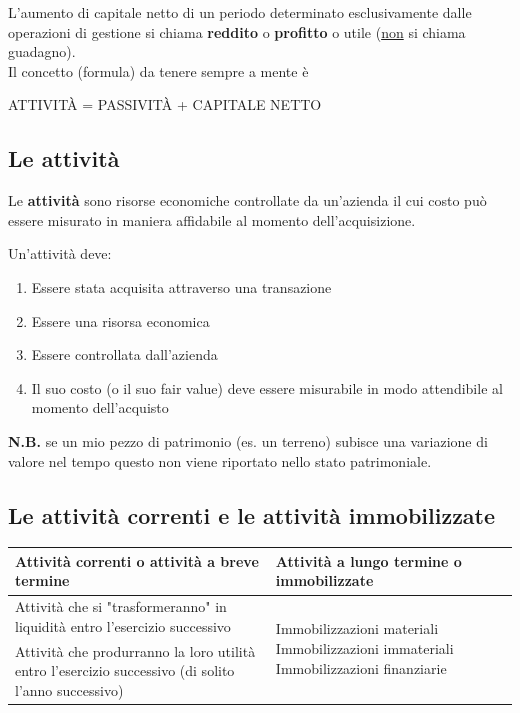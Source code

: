 \documentclass{article}
\begin{document}
L'aumento di capitale netto di un periodo determinato esclusivamente dalle
operazioni di gestione si chiama \textbf{reddito} o \textbf{profitto} o utile (\underline{non} si chiama
guadagno).
\vspace*{0.2cm}\\
Il concetto (formula) da tenere sempre a mente è 
\begin{center}
    ATTIVITÀ = PASSIVITÀ + CAPITALE NETTO
\end{center}



\subsection{Le attività}
\begin{center}
    Le \textbf{attività} sono risorse economiche controllate da un'azienda il cui costo può essere misurato in maniera affidabile al momento dell'acquisizione.
\end{center}
Un'attività deve:
\begin{enumerate}
    \item Essere stata acquisita attraverso una transazione
    \item Essere una risorsa economica
    \item Essere controllata dall'azienda
    \item Il suo costo (o il suo fair value) deve essere misurabile in modo attendibile al momento dell'acquisto
\end{enumerate}
\textbf{N.B.} se un mio pezzo di patrimonio (es. un terreno) subisce una variazione di valore nel tempo questo non viene riportato nello stato patrimoniale.


\subsection{Le attività correnti e le attività
immobilizzate}
\begin{center}
    \renewcommand{\arraystretch}{2}
    \begin{tabular}{|m{5cm}|m{5cm}|}
        \hline 
        \textbf{Attività correnti o attività a breve termine} & \textbf{Attività a lungo termine o immobilizzate}\\
        \hline 
        Attività che si "trasformeranno" in liquidità entro l'esercizio successivo & \multirow{2}{14em}{Immobilizzazioni materiali Immobilizzazioni immateriali  Immobilizzazioni finanziarie}
        \\
        Attività che produrranno la loro utilità entro l'esercizio successivo (di solito l'anno successivo) & \\
        \hline 
    \end{tabular}
\end{center}
\end{document}
